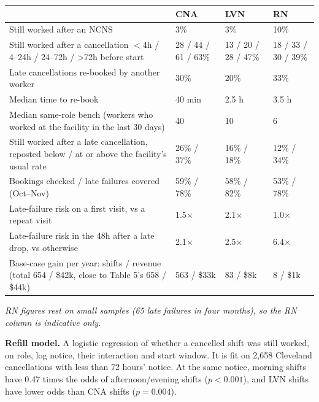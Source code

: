 \documentclass[11pt]{article}
\newcommand{\lthan}{\ensuremath{<}}
\begin{document}
\begin{center}\small
{}
\begin{tabularx}{\textwidth}{@{}LR{3.0cm}R{3.0cm}R{3.0cm}@{}}
\toprule
 & CNA & LVN & RN \\
\midrule
Still worked after an NCNS & 3\% & 3\% & 10\% \\
Still worked after a cancellation \lthan{}4h / 4--24h / 24--72h / \textgreater72h before start & 28 / 44 / 61 / 63\% &
13 / 20 / 28 / 47\% & 18 / 33 / 30 / 39\% \\
Late cancellations re-booked by another worker & 30\% & 20\% & 33\% \\
Median time to re-book & 40 min & 2.5 h & 3.5 h \\
Median same-role bench (workers who worked at the facility in the last 30 days) & 40 & 10 & 6 \\
Still worked after a late cancellation, reposted below / at or above the facility's usual rate & 26\% / 37\% & 16\% /
18\% & 12\% / 34\% \\
Bookings checked / late failures covered (Oct--Nov) & 59\% / 78\% & 58\% / 82\% & 53\% / 78\% \\
Late-failure risk on a first visit, vs a repeat visit & 1.5$\times$ & 2.1$\times$ & 1.0$\times$ \\
Late-failure risk in the 48h after a late drop, vs otherwise & 2.1$\times$ & 2.5$\times$ & 6.4$\times$ \\
Base-case gain per year: shifts / revenue (total 654 / \$42k, close to Table 5's 658 / \$44k) & 563 / \$33k & 83 / \$8k &
8 / \$1k \\
\bottomrule
\end{tabularx}
\end{center}
{\small\textit{RN figures rest on small samples (65 late failures in four months), so the RN column is indicative only.}}

\textbf{Refill model.} A logistic regression of whether a cancelled shift was still worked, on role, log notice, their
interaction and start window. It is fit on 2,658 Cleveland cancellations with less than 72 hours' notice. At the same
notice, morning shifts have 0.47 times the odds of afternoon/evening shifts ($p<0.001$), and LVN shifts have lower odds
than CNA shifts ($p=0.004$).
\end{document}
